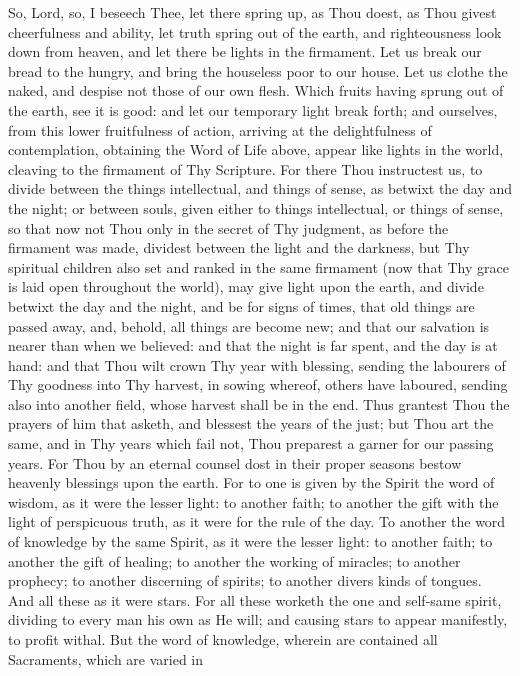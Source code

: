 \documentclass[b5paper,openright,12pt,twoside]{book}
\begin{document}
So, Lord, so, I beseech Thee, let there spring up, as Thou doest, as
Thou givest cheerfulness and ability, let truth spring out of the earth,
and righteousness look down from heaven, and let there be lights in the
firmament. Let us break our bread to the hungry, and bring the houseless
poor to our house. Let us clothe the naked, and despise not those of our
own flesh. Which fruits having sprung out of the earth, see it is good:
and let our temporary light break forth; and ourselves, from this lower
fruitfulness of action, arriving at the delightfulness of contemplation,
obtaining the Word of Life above, appear like lights in the world,
cleaving to the firmament of Thy Scripture. For there Thou instructest
us, to divide between the things intellectual, and things of sense, as
betwixt the day and the night; or between souls, given either to things
intellectual, or things of sense, so that now not Thou only in the
secret of Thy judgment, as before the firmament was made, dividest
between the light and the darkness, but Thy spiritual children also
set and ranked in the same firmament (now that Thy grace is laid open
throughout the world), may give light upon the earth, and divide betwixt
the day and the night, and be for signs of times, that old things
are passed away, and, behold, all things are become new; and that our
salvation is nearer than when we believed: and that the night is far
spent, and the day is at hand: and that Thou wilt crown Thy year with
blessing, sending the labourers of Thy goodness into Thy harvest, in
sowing whereof, others have laboured, sending also into another field,
whose harvest shall be in the end. Thus grantest Thou the prayers of him
that asketh, and blessest the years of the just; but Thou art the same,
and in Thy years which fail not, Thou preparest a garner for our passing
years. For Thou by an eternal counsel dost in their proper seasons
bestow heavenly blessings upon the earth. For to one is given by the
Spirit the word of wisdom, as it were the lesser light: to another
faith; to another the gift with the light of perspicuous truth, as it
were for the rule of the day. To another the word of knowledge by the
same Spirit, as it were the lesser light: to another faith; to another
the gift of healing; to another the working of miracles; to another
prophecy; to another discerning of spirits; to another divers kinds of
tongues. And all these as it were stars. For all these worketh the one
and self-same spirit, dividing to every man his own as He will; and
causing stars to appear manifestly, to profit withal. But the word of
knowledge, wherein are contained all Sacraments, which are varied in
\end{document}
